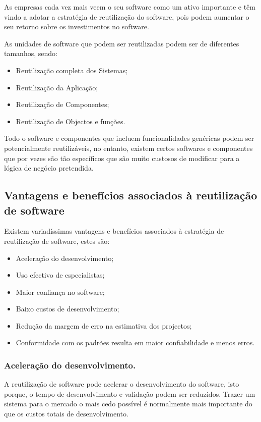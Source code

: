 \documentclass[runningheads]{llncs}
\begin{document}
As empresas cada vez mais veem o seu software como um ativo importante e têm vindo a  adotar a estratégia de reutilização do software, pois podem aumentar o seu retorno sobre os investimentos no software.\par
As unidades de software que podem ser reutilizadas podem ser de diferentes tamanhos, sendo:

\begin{itemize}
    \item Reutilização completa dos Sistemas;
    \item Reutilização da Aplicação;
    \item Reutilização de Componentes;
    \item Reutilização de Objectos e funções.
\end{itemize}

Todo o software e componentes que incluem funcionalidades genéricas podem ser potencialmente reutilizáveis, no entanto, existem certos softwares e componentes que por vezes são tão específicos que são muito custosos de modificar para a lógica de negócio pretendida.

\subsection{Vantagens e benefícios associados à reutilização de software}

Existem variadíssimas vantagens e benefícios associados à estratégia de reutilização de software, estes são:

\begin{itemize}
    \item Aceleração do desenvolvimento;
    \item Uso efectivo de especialistas;
    \item Maior confiança no software;
    \item Baixo custos de desenvolvimento;
    \item Redução da margem de erro na estimativa dos projectos;
    \item Conformidade com os padrões resulta em maior confiabilidade e menos erros.
\end{itemize}

\subsubsection{Aceleração do desenvolvimento.}

A reutilização de software pode acelerar o desenvolvimento do software, isto porque, o tempo de desenvolvimento e validação podem ser reduzidos. Trazer um sistema para o mercado o mais cedo possível é normalmente mais importante do que os custos totais de desenvolvimento.
\end{document}
